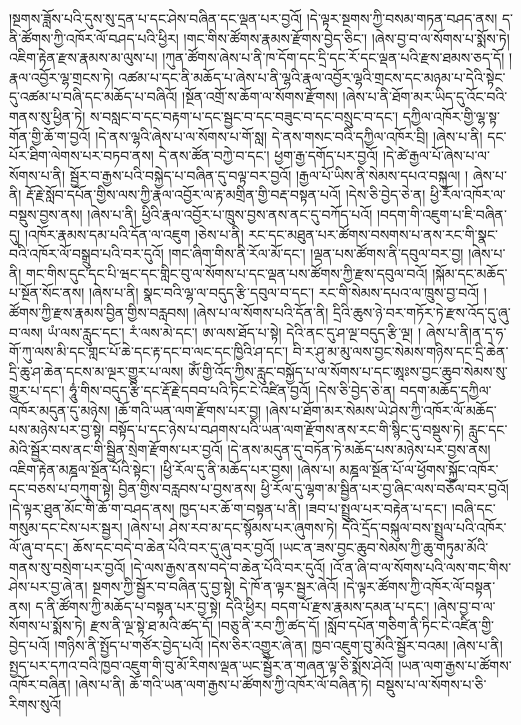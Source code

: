 །སྔགས་ཟློས་པའི་དུས་སུ་དྲན་པ་དང་ཤེས་བཞིན་དང་ལྡན་པར་བྱའོ། །དེ་ལྟར་​ སྔགས་ཀྱི་བསམ་གཏན་བཤད་ནས། ད་ནི་ཚོགས་ཀྱི་འཁོར་ལོ་བཤད་པའི་ཕྱིར། །གང་གིས་ཚོགས་རྣམས་རྫོགས་བྱེད་ཅིང་། །ཞེས་བྱ་བ་ལ་སོགས་པ་སྨོས་ཏེ། འཇིག་རྟེན་རྫས་རྣམས་མ་ལུས་པ། །ཀུན་ཚོགས་ཞེས་པ་ནི་ཁ་དོག་དང་དྲི་དང་རོ་དང་ལྡན་པའི་རྫས་ཐམས་ཅད་དོ། །རྣལ་འབྱོར་ལྷ་གྲངས་ཏེ། འཚམ་པ་དང་ནི་མཆོད་པ་ཞེས་པ་ནི་ལྷའི་རྣལ་འབྱོར་ལྷའི་གྲངས་དང་མཉམ་པ་དེའི་སྟེང་དུ་འཚམ་པ་བཞི་དང་མཆོད་པ་བཞིའོ། །སྔོན་འགྲོ་ས་ཆོག་ལ་སོགས་རྫོགས། །ཞེས་པ་ནི་ཐོག་མར་ཡིད་དུ་འོང་བའི་གནས་སུ་ཕྱིན་ཏེ། ས་བསླང་བ་དང་བརྟག་པ་དང་སྦྱང་བ་དང་བཟུང་བ་དང་བསྲུང་བ་དང་། དཀྱིལ་འཁོར་གྱི་ལྷ་སྟ་གོན་གྱི་ཆོ་ག་བྱའོ། །དེ་ནས་ལྷའི་ཞེས་པ་ལ་སོགས་པ་གོ་སླ། དེ་ནས་གསང་བའི་དཀྱིལ་འཁོར་བྲི། །ཞེས་པ་ནི། དང་པོར་ཐིག་ལེགས་པར་བཏབ་ནས། དེ་ནས་ཚོན་བཀྱེ་བ་དང་། ཕྱག་རྒྱ་དགོད་པར་བྱའོ། །དེ་ཚེ་རྒྱལ་པོ་ཞེས་པ་ལ་སོགས་པ་ནི། སྦྱོར་བ་རྒྱས་པའི་བསྐྱེད་པ་བཞིན་དུ་བལྟ་བར་བྱའོ། །རྒྱལ་པོ་ཡིས་ནི་སེམས་དཔའ་བསྐུལ། །
ཞེས་པ་ནི། རྡོ་རྗེ་སློབ་དཔོན་གྱིས་ལས་ཀྱི་རྣལ་འབྱོར་ལ་རྟ་མགྲིན་གྱི་བརྡ་བསྟན་པའོ། །དེས་ཅི་བྱེད་ཅེ་ན། ཕྱི་རོལ་འཁོར་ལ་བསྡུས་བྱས་ནས། །ཞེས་པ་ནི། ཕྱིའི་རྣལ་འབྱོར་པ་ཁྲུས་བྱས་ནས་ནང་དུ་བཀོད་པའོ། །བདག་གི་འཇུག་པ་ཇི་བཞིན་དུ། །འཁོར་རྣམས་དམ་པའི་དོན་ལ་འཇུག །ཅེས་པ་ནི། རང་དང་མཐུན་པར་ཚོགས་བསགས་པ་ནས་རང་གི་སྣང་བའི་འཁོར་ལོ་བསྒྲུབ་པའི་བར་དུའོ། །གང་ཞིག་གིས་ནི་རོལ་མོ་དང་། །ལྡན་པས་ཚོགས་ནི་དབུལ་བར་བྱ། །ཞེས་པ་ནི། གང་གིས་དུང་དང་པི་ཝང་དང་གླིང་བུ་ལ་སོགས་པ་དང་ལྡན་པས་ཚོགས་ཀྱི་རྫས་དབུལ་བའོ། །སྐོམ་དང་མཆོད་པ་སྔོན་སོང་ནས། །ཞེས་པ་ནི། སྣང་བའི་ལྷ་ལ་བདུད་རྩི་དབུལ་བ་དང་། རང་གི་སེམས་དཔའ་ལ་ཁྲུས་བྱ་བའོ། །ཚོགས་ཀྱི་རྫས་རྣམས་བྱིན་གྱིས་བརླབས། །ཞེས་པ་ལ་སོགས་པའི་དོན་ནི། དྲིའི་ཆུས་ཉེ་བར་གཏོར་ཏེ་རྫས་འོད་དུ་ཞུ་བ་ལས། ཡཾ་ལས་རླུང་དང་། རཾ་ལས་མེ་དང་། ཨ་ལས་ཐོད་པ་སྟེ། དེའི་ནང་དུ་ཤ་ལྔ་བདུད་རྩི་ལྔ། །  ​ ཞེས་པ་ནི།ན་ད་ཧ་གོ་ཀུ་ལས་མི་དང་གླང་པོ་ཆེ་དང་རྟ་དང་བ་ལང་དང་ཁྱིའི་ཤ་དང་། བི་ར་ཤུ་མ་མུ་ལས་བྱང་སེམས་གཉིས་དང་དྲི་ཆེན་དྲི་ཆུ་ཤ་ཆེན་དངས་མ་ལྔར་གྱུར་པ་ལས། ཨོཾ་གྱི་འོད་ཀྱིས་རླུང་བསྐྱོད་པ་ལ་སོགས་པ་དང་ཨཱཿས་བྱང་ཆུབ་སེམས་སུ་གྱུར་པ་དང་། ཧཱུཾ་གིས་བདུད་རྩི་དང་རྡོ་རྗེ་དབབ་པའི་ཏིང་ངེ་འཛིན་བྱའོ། །དེས་ཅི་བྱེད་ཅེ་ན། བདག་མཆོད་དཀྱིལ་འཁོར་མདུན་དུ་མཉེས། །ཆོ་གའི་ཡན་ལག་རྫོགས་པར་བྱ། །ཞེས་པ་ཐོག་མར་སེམས་ཡེ་ཤེས་ཀྱི་འཁོར་ལོ་མཆོད་པས་མཉེས་པར་བྱ་སྟེ། བསྟོད་པ་དང་ཉེས་པ་བཤགས་པའི་ཡན་ལག་རྫོགས་ནས་རང་གི་སྙིང་དུ་བསྡུས་ཏེ། རླུང་དང་མེའི་སྦྱོར་བས་ནང་གི་སྦྱིན་སྲེག་རྫོགས་པར་བྱའོ། །དེ་ནས་མདུན་དུ་བཏོན་ཏེ་མཆོད་པས་མཉེས་པར་བྱས་ནས། འཇིག་རྟེན་མཎྜལ་སྔོན་པོའི་སྟེང་། །ཕྱི་རོལ་དུ་ནི་མཆོད་པར་བྱས། །ཞེས་པ། མཎྜལ་སྔོན་པོ་ལ་ཕྱོགས་སྐྱོང་འཁོར་དང་བཅས་པ་བཀུག་སྟེ། བྱིན་གྱིས་བརླབས་པ་བྱས་ནས། ཕྱི་རོལ་དུ་ལྷག་མ་སྦྱིན་པར་བྱ་ཞིང་ལས་བཅོལ་བར་བྱའོ། །དེ་ལྟར་ཐུན་མོང་གི་ཆོ་ག་བཤད་ནས། ཁྱད་པར་ཆོ་ག་བསྟན་པ་ནི། །ཟབ་པ་སྤྲུལ་པར་བརྟེན་པ་དང་། །བཞི་དང་གསུམ་དང་ངེས་པར་སྦྱར། །ཞེས་པ། ཤེས་རབ་མ་དང་སྙོམས་པར་ཞུགས་ཏེ། དེའི་དྲོད་བསྐུལ་བས་སྤྲུལ་པའི་འཁོར་ལོ་ཞུ་བ་དང་། ཆོས་དང་བདེ་བ་ཆེན་པོའི་བར་དུ་ཞུ་བར་བྱའོ། །ཡང་ན་ཟས་བྱང་ཆུབ་སེམས་ཀྱི་ཆུ་གཏུམ་མོའི་གནས་སུ་བསྲེག་པར་བྱའོ། །དེ་ལས་རྒྱས་ནས་བདེ་བ་ཆེན་པོའི་བར་དུའོ། །འོ་ན་ཞི་བ་ལ་སོགས་པའི་ལས་གང་གིས་ཤེས་པར་བྱ་ཞེ་ན། སྔགས་ཀྱི་སྦྱོར་བ་བཞིན་དུ་བྱ་སྟེ། དེ་ཁོ་ན་ལྟར་སྦྱར་ཞེའོ། །དེ་ལྟར་ཚོགས་ཀྱི་འཁོར་ལོ་བསྟན་ནས། ད་ནི་ཚོགས་ཀྱི་མཆོད་པ་བསྟན་པར་བྱ་སྟེ། དེའི་ཕྱིར། བདག་པོ་རྫས་རྣམས་དམན་པ་དང་། །ཞེས་བྱ་བ་ལ་སོགས་པ་སྨོས་ཏེ། རྫས་ནི་ལྔ་སྟེ་ཐ་མའི་ཚད་དོ། །བཅུ་ནི་རབ་ཀྱི་ཚད་དོ། །སློབ་དཔོན་གཅིག་ནི་ཏིང་ངེ་འཛིན་གྱི་བྱེད་པའོ། །གཉིས་ནི་སྤྱོད་པ་གཙོར་བྱེད་པའོ། །དེས་ཅིར་འགྱུར་ཞེ་ན། ཁྱབ་འཇུག་བུ་མོའི་སྦྱོར་བའམ། །ཞེས་པ་ནི།  ​ སྤྱད་པར་དཀའ་བའི་ཁྱབ་འཇུག་གི་བུ་མོ་རིགས་ལྡན་ཡང་སྦྱོར་ན་གཞན་ལྟ་ཅི་སྨོས་ཤེའོ། །ཡན་ལག་རྒྱས་པ་ཚོགས་འཁོར་བཞིན། །ཞེས་པ་ནི། ཆོ་གའི་ཡན་ལག་རྒྱས་པ་ཚོགས་ཀྱི་འཁོར་ལོ་བཞིན་ཏེ། བསྡུས་པ་ལ་སོགས་པ་ཅི་རིགས་སུའོ། 